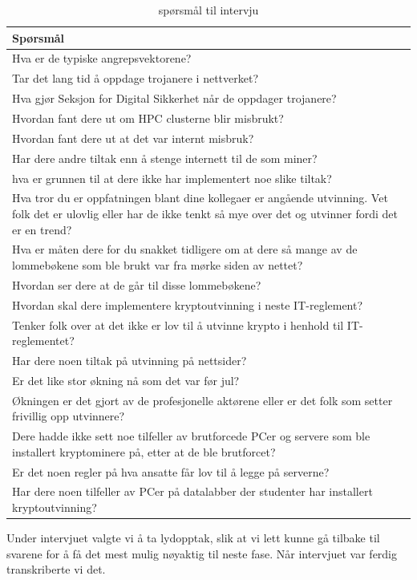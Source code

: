 \begin{table}[H]
    \centering
    \begin{tabular}{|m{30em}|} 
        \hline
             \cellcolor{yellow} Spørsmål  \\
        \hline
          Hva er de typiske angrepsvektorene?  \\
         \hline
         Tar det lang tid å oppdage trojanere i nettverket? \\ 
         \hline
         Hva gjør Seksjon for Digital Sikkerhet når de oppdager trojanere? \\
         \hline
         Hvordan fant dere ut om HPC clusterne blir misbrukt? \\
         \hline
         Hvordan fant dere ut at det var internt misbruk?\\
         \hline
         Har dere andre tiltak enn å stenge internett til de som miner? \\
         \hline
         hva er grunnen til at dere ikke har implementert noe slike tiltak? \\
         \hline
         Hva tror du er oppfatningen blant dine kollegaer er angående utvinning. Vet folk det er ulovlig eller har de ikke tenkt så mye over det og utvinner fordi det er en trend? \\
         \hline
         Hva er måten dere for du snakket tidligere om at dere så mange av de lommebøkene som ble brukt var fra mørke siden av nettet?  \\
         \hline
         Hvordan ser dere at de går til disse lommebøkene? \\
         \hline
         Hvordan skal dere implementere kryptoutvinning i neste IT-reglement? \\
          \hline
         Tenker folk over at det ikke er lov til å utvinne krypto i henhold til IT-reglementet? \\
          \hline
         Har dere noen tiltak på utvinning på nettsider? \\
          \hline
         Er det like stor økning nå som det var før jul? \\
          \hline
         Økningen er det gjort av de profesjonelle aktørene eller er det folk som setter frivillig opp utvinnere? \\
          \hline
         Dere hadde ikke sett noe tilfeller av brutforcede PCer og servere som ble installert kryptominere på, etter at de ble brutforcet?  \\
          \hline
         Er det noen regler på hva ansatte får lov til å legge på serverne? \\
          \hline
         Har dere noen tilfeller av PCer på datalabber der studenter har installert kryptoutvinning?
          \hline
    \end{tabular}
    \caption[Spørsmål]{spørsmål til intervju}
    \label{tab:spm-intervju}
\end{table}
Under intervjuet valgte vi å ta lydopptak, slik at vi lett kunne gå tilbake til svarene for å få det mest mulig nøyaktig til neste fase. Når intervjuet var ferdig transkriberte vi det.

